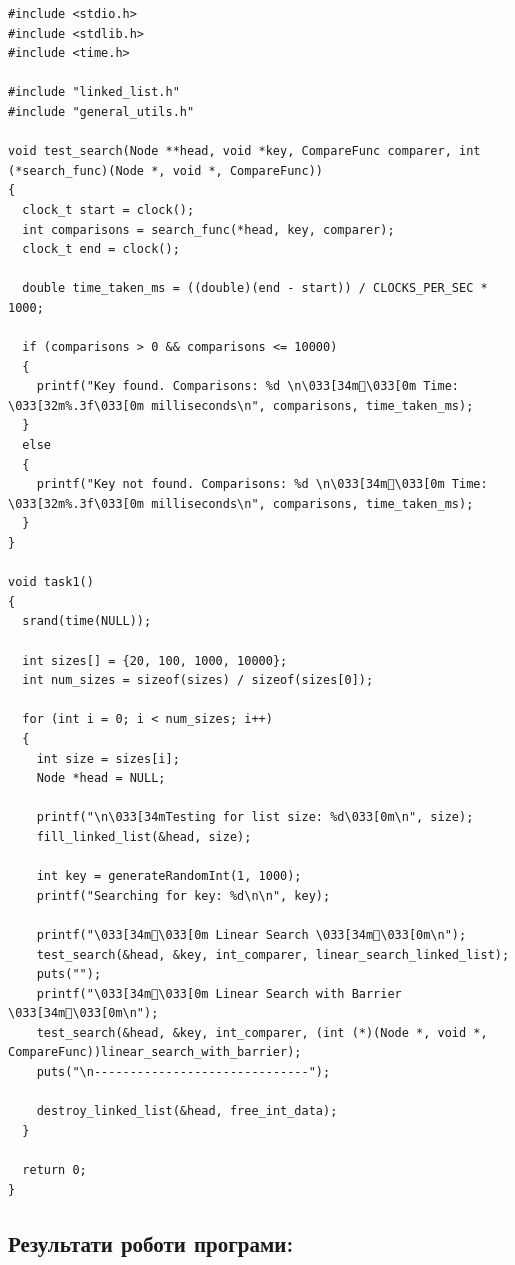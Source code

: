 \begin{lstlisting}[style=customc]
#include <stdio.h>
#include <stdlib.h>
#include <time.h>

#include "linked_list.h"
#include "general_utils.h"

void test_search(Node **head, void *key, CompareFunc comparer, int (*search_func)(Node *, void *, CompareFunc))
{
  clock_t start = clock();
  int comparisons = search_func(*head, key, comparer);
  clock_t end = clock();

  double time_taken_ms = ((double)(end - start)) / CLOCKS_PER_SEC * 1000;

  if (comparisons > 0 && comparisons <= 10000)
  {
    printf("Key found. Comparisons: %d \n\033[34m\033[0m Time: \033[32m%.3f\033[0m milliseconds\n", comparisons, time_taken_ms);
  }
  else
  {
    printf("Key not found. Comparisons: %d \n\033[34m\033[0m Time: \033[32m%.3f\033[0m milliseconds\n", comparisons, time_taken_ms);
  }
}

void task1()
{
  srand(time(NULL));

  int sizes[] = {20, 100, 1000, 10000};
  int num_sizes = sizeof(sizes) / sizeof(sizes[0]);

  for (int i = 0; i < num_sizes; i++)
  {
    int size = sizes[i];
    Node *head = NULL;

    printf("\n\033[34mTesting for list size: %d\033[0m\n", size);
    fill_linked_list(&head, size);

    int key = generateRandomInt(1, 1000);
    printf("Searching for key: %d\n\n", key);

    printf("\033[34m\033[0m Linear Search \033[34m\033[0m\n");
    test_search(&head, &key, int_comparer, linear_search_linked_list);
    puts("");
    printf("\033[34m\033[0m Linear Search with Barrier \033[34m\033[0m\n");
    test_search(&head, &key, int_comparer, (int (*)(Node *, void *, CompareFunc))linear_search_with_barrier);
    puts("\n------------------------------");

    destroy_linked_list(&head, free_int_data);
  }

  return 0;
}
\end{lstlisting}

\clearpage
\subsection{Результати роботи програми:}

